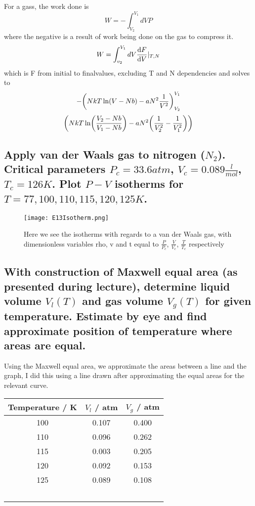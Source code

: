 \documentclass[a4paper,11pt]{article}
\begin{document}
\subsubsection{}
For a gass, the work done is
\[ W = - \int_{V_2}^{V_1} dV P \]
where the negative is a result of work being done on the gas to compress it. 
\[ W = \int_{v_2}^{V_1} dV \dv{F}{V}|_{T,N} \]
 which is F from initial to finalvalues, excluding T and N dependencies and solves to
\[ - \qty( NkT\ln( V - Nb) - aN^2\frac{1}{V^2} )_{V_2}^{V_1} \]
\[ \qty( NkT\ln(\frac{V_2 - Nb}{V_1 - Nb}) - aN^2\qty(\frac{1}{V_2^2} - \frac{1}{V_1^2} ) ) \]


\subsection{ Apply van der Waals gas to nitrogen ($N_2$). Critical parameters $P_c = 33.6atm$, 
            $V_c = 0.089\frac{l}{mol}$, $T_c = 126 K$. Plot $P - V$ isotherms for $T = 77, 100, 110, 115, 120, 125 K$. }%

\begin{figure}[hbtp]
\texttt{[image: E13Isotherm.png]}
\caption{Here we see the isotherms with regards to a van der Waals gas, with dimensionless variables rho, v and t equal to 
        $\frac{P}{P_c}$, $\frac{V}{V_c}$, $\frac{T}{T_c}$ respectively}
 \label{isotherm}
\end{figure}

\subsection{ With construction of Maxwell equal area (as presented during lecture), determine liquid volume $V_l(T)$
            and gas volume $V_g(T)$ for given temperature. Estimate by eye and find approximate position of temperature
            where areas are equal. } %

Using the Maxwell equal area, we approximate the areas between a line and the graph, I did this using a line drawn after 
approximating the equal areas for the relevant curve. 

\begin{tabular}{ccc}
\hline
\multicolumn{1}{c}{ Temperature / K } & \multicolumn{1}{c}{ $V_l$ / atm } & \multicolumn{1}{c}{ $V_g$ / atm } \\
\hline
100 &  0.107 &  0.400      \\ %
110 &  0.096 &  0.262      \\ %
115 &  0.003 &  0.205      \\ %
120 &  0.092 &  0.153      \\ %
125 &  0.089 &  0.108      \\ %
\hline
    \label{VlVg}
\
\end{tabular}\\
\end{document}
